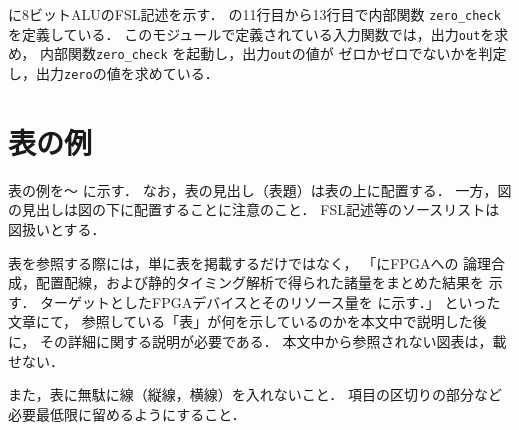 \documentclass{ujarticle}[11pt]
\newcommand{\figref}[1]{\makebox{図~\ref{#1}}}
\newcommand{\tabref}[1]{\makebox{表~\ref{#1}}}
\begin{document}
    \figref{fig:8ビットALUのFSL記述}に8ビットALUのFSL記述を示す．
    \figref{fig:8ビットALUのFSL記述}の11行目から13行目で内部関数
    \verb|zero_check| を定義している．
    このモジュールで定義されている入力関数では，出力\verb|out|を求め，
    内部関数\verb|zero_check| を起動し，出力\verb|out|の値が
    ゼロかゼロでないかを判定し，出力\verb|zero|の値を求めている．
     
    \section{表の例}
     
    表の例を\tabref{tab:FPGAへの論理合成等で得られた諸量のまとめ}〜
    \tabref{tab:目標達成度と自己評価}に示す．
    なお，表の見出し（表題）は表の上に配置する．
    一方，図の見出しは図の下に配置することに注意のこと．
    FSL記述等のソースリストは図扱いとする．
     
    表を参照する際には，単に表を掲載するだけではなく，
    「\tabref{tab:FPGAへの論理合成等で得られた諸量のまとめ}にFPGAへの
    論理合成，配置配線，および静的タイミング解析で得られた諸量をまとめた結果を
    示す．
    ターゲットとしたFPGAデバイスとそのリソース量を
    \tabref{tab:ターゲットFPGAデバイスとそのリソース量}に示す．」
    といった文章にて，
    参照している「表」が何を示しているのかを本文中で説明した後に，
    その詳細に関する説明が必要である．
    本文中から参照されない図表は，載せない．
     
    また，表に無駄に線（縦線，横線）を入れないこと．
    項目の区切りの部分など必要最低限に留めるようにすること．
     
     
     
\end{document}
